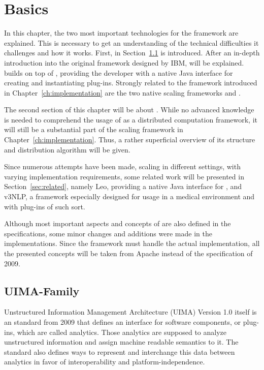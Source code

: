 
\chapter{Basics}
\label{ch:basics}
In this chapter, the two most important technologies for the framework are explained. This is necessary to get an understanding of the technical difficulties it challenges and how it works. First, in Section~\ref{sec:uima} \uima{} is introduced. After an in-depth introduction into the original framework designed by IBM, \uimafit{} will be explained. \uimafit{} builds on top of \uima{}, providing the developer with a native Java interface for creating and instantiating plug-ins. Strongly related to the framework introduced in Chapter~\ref{ch:implementation} are the two native scaling frameworks \uimacpe{} and \uimaas{}. 


The second section of this chapter will be about \spark{}. While no advanced knowledge is needed to comprehend the usage of \spark{} as a distributed computation framework, it will still be a substantial part of the \uima{} scaling framework in Chapter~\ref{ch:implementation}. Thus, a rather superficial overview of its structure and distribution algorithm will be given.

Since numerous attempts have been made, scaling \uima{} in different settings, with varying implementation requirements, some related work will be presented in Section~\ref{sec:related}, namely Leo, providing a native Java interface for \uimaas{}, and v3NLP, a framework especially designed for usage in a medical environment and with plug-ins of such sort.

Although most important aspects and concepts of \uima{} are also defined in the specifications, some minor changes and additions were made in the implementations. Since the framework must handle the actual implementation, all the presented concepts will be taken from Apache \uima{} instead of the \uima{} specification of 2009.



\section{UIMA-Family}
\label{sec:uima}
Unstructured Information Management Architecture (UIMA) Version 1.0 itself is an \oasis{} standard from 2009 that defines an interface for software components, or plug-ins, which are called analytics. Those analytics are supposed to analyze unstructured information and assign machine readable semantics to it. The standard also defines ways to represent and interchange this data between analytics in favor of interoperability and platform-independence. 

